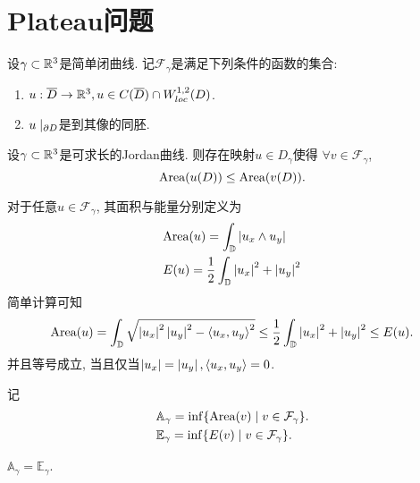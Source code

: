 \chapter{Plateau问题}
\newcommand{\FG}{{\mathcal{F}_\gamma}}
\newcommand{\AG}{{\mathbb{A}_\gamma}}
\renewcommand{\EG}{{\mathbb{E}_\gamma}}
\renewcommand{\E}{{E}}
\renewcommand{\D}{{\mathbb{D}}}
设$\gamma \subset \R^3$是简单闭曲线. 记$\FG$是满足下列条件的函数的集合:
\begin{enumerate}
    \item $u: \overline{D} \to \R^3, u\in C(\overline{D})\cap W_{loc}^{1,2}(D)$.
    \item $u\mid_{\P D}$是到其像的同胚.
\end{enumerate}
\begin{theorem}
    设$\gamma \subset \R^3$是可求长的Jordan曲线. 则存在映射$u \in D_\gamma$使得 $\forall v \in \FG$, 
    \begin{equation}
        \Area(u(D))\le \Area(v(D)).
    \end{equation}
\end{theorem}
对于任意$u \in \FG$, 其面积与能量分别定义为
\begin{align}
    &\Area(u)=\int_\D\abs{u_x\wedge u_y} \\
    &\E(u)=\frac{1}{2}\int_\D\abs{u_x}^2+\abs{u_y}^2
\end{align}
简单计算可知
\begin{equation}\label{AleE}
    \Area(u)=\int_\D \sqrt{\abs{u_x}^2\abs{u_y}^2-\inner{u_x}{u_y}^2} \le \frac{1}{2}\int_\D \abs{u_x}^2+\abs{u_y}^2 \le\E(u).
\end{equation}
并且等号成立, 当且仅当$\abs{u_x}=\abs{u_y}, \inner{u_x}{u_y}=0$.
\par 记
\begin{align}
    &\AG=\inf\{\Area(v)\mid v \in \FG\}.\\
    &\EG=\inf \{\E(v)\mid v \in \FG\}.
\end{align}
\begin{lemma}
    $\AG=\EG$.
\end{lemma}
